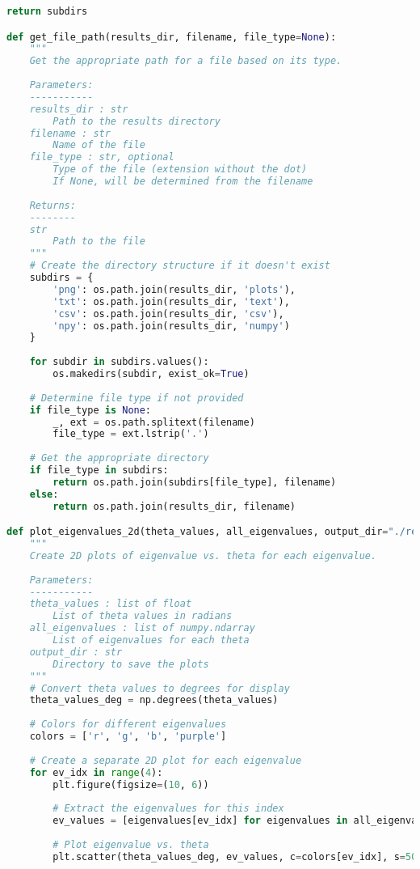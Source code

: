 \begin{lstlisting}[language=Python]
    return subdirs

def get_file_path(results_dir, filename, file_type=None):
    """
    Get the appropriate path for a file based on its type.
    
    Parameters:
    -----------
    results_dir : str
        Path to the results directory
    filename : str
        Name of the file
    file_type : str, optional
        Type of the file (extension without the dot)
        If None, will be determined from the filename
    
    Returns:
    --------
    str
        Path to the file
    """
    # Create the directory structure if it doesn't exist
    subdirs = {
        'png': os.path.join(results_dir, 'plots'),
        'txt': os.path.join(results_dir, 'text'),
        'csv': os.path.join(results_dir, 'csv'),
        'npy': os.path.join(results_dir, 'numpy')
    }
    
    for subdir in subdirs.values():
        os.makedirs(subdir, exist_ok=True)
    
    # Determine file type if not provided
    if file_type is None:
        _, ext = os.path.splitext(filename)
        file_type = ext.lstrip('.')
    
    # Get the appropriate directory
    if file_type in subdirs:
        return os.path.join(subdirs[file_type], filename)
    else:
        return os.path.join(results_dir, filename)

def plot_eigenvalues_2d(theta_values, all_eigenvalues, output_dir="./results"):
    """
    Create 2D plots of eigenvalue vs. theta for each eigenvalue.
    
    Parameters:
    -----------
    theta_values : list of float
        List of theta values in radians
    all_eigenvalues : list of numpy.ndarray
        List of eigenvalues for each theta
    output_dir : str
        Directory to save the plots
    """
    # Convert theta values to degrees for display
    theta_values_deg = np.degrees(theta_values)
    
    # Colors for different eigenvalues
    colors = ['r', 'g', 'b', 'purple']
    
    # Create a separate 2D plot for each eigenvalue
    for ev_idx in range(4):
        plt.figure(figsize=(10, 6))
        
        # Extract the eigenvalues for this index
        ev_values = [eigenvalues[ev_idx] for eigenvalues in all_eigenvalues]
        
        # Plot eigenvalue vs. theta
        plt.scatter(theta_values_deg, ev_values, c=colors[ev_idx], s=50)
        

\end{lstlisting}
